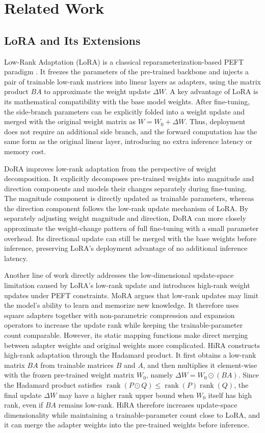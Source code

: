 \documentclass[a4paper,11pt]{article}
\newcommand{\DeltaW}{\Delta W}
\newcommand{\rank}{\operatorname{rank}}
\begin{document}
\section{Related Work}

\subsection{LoRA and Its Extensions}

Low-Rank Adaptation (LoRA) is a classical reparameterization-based PEFT paradigm \cite{hu2022lora}. It freezes the parameters of the pre-trained backbone and injects a pair of trainable low-rank matrices into linear layers as adapters, using the matrix product $BA$ to approximate the weight update $\DeltaW$. A key advantage of LoRA is its mathematical compatibility with the base model weights. After fine-tuning, the side-branch parameters can be explicitly folded into a weight update and merged with the original weight matrix as $W=W_0+\DeltaW$. Thus, deployment does not require an additional side branch, and the forward computation has the same form as the original linear layer, introducing no extra inference latency or memory cost.

DoRA \cite{liu2024dora} improves low-rank adaptation from the perspective of weight decomposition. It explicitly decomposes pre-trained weights into magnitude and direction components and models their changes separately during fine-tuning. The magnitude component is directly updated as trainable parameters, whereas the direction component follows the low-rank update mechanism of LoRA. By separately adjusting weight magnitude and direction, DoRA can more closely approximate the weight-change pattern of full fine-tuning with a small parameter overhead. Its directional update can still be merged with the base weights before inference, preserving LoRA's deployment advantage of no additional inference latency.

Another line of work directly addresses the low-dimensional update-space limitation caused by LoRA's low-rank update and introduces high-rank weight updates under PEFT constraints. MoRA \cite{jiang2024mora} argues that low-rank updates may limit the model's ability to learn and memorize new knowledge. It therefore uses square adapters together with non-parametric compression and expansion operators to increase the update rank while keeping the trainable-parameter count comparable. However, its static mapping functions make direct merging between adapter weights and original weights more complicated. HiRA \cite{huang2025hira} constructs high-rank adaptation through the Hadamard product. It first obtains a low-rank matrix $BA$ from trainable matrices $B$ and $A$, and then multiplies it element-wise with the frozen pre-trained weight matrix $W_0$, namely $\DeltaW = W_0 \odot (BA)$. Since the Hadamard product satisfies $\rank(P\odot Q)\leq \rank(P)\rank(Q)$, the final update $\DeltaW$ may have a higher rank upper bound when $W_0$ itself has high rank, even if $BA$ remains low-rank. HiRA therefore increases update-space dimensionality while maintaining a trainable-parameter count close to LoRA, and it can merge the adapter weights into the pre-trained weights before inference.
\end{document}
